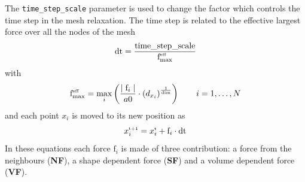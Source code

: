 \documentclass[10pt,a4paper]{book}
\newcommand{\py}[1]{\texttt{\color{blue}#1}}
\begin{document}
The \py{time\_step\_scale} parameter is used to change the factor
which controls the time step in the mesh relaxation. The time step 
is related to the effective largest force over all the nodes of the
mesh  
\begin{equation}
  \textrm{dt} = \frac{
    \textrm{time\_step\_scale}}{\textrm{f}^\textrm{\tiny eff}_{\max}}  
  \end{equation}
  with
  \begin{equation} 
  \textrm{f}^\textrm{\tiny eff}_{\max} = \max_i \left(  
    \frac{\mid \textrm{f}_{\tiny i} \mid}
    {a0} \cdot \left( d_{x_i}
    \right)^{\frac{1}{\textrm{\tiny dim}}}  \right) \qquad i = 1,
  \ldots, N
  \label{eff-force-max}
  \nonumber
\end{equation}
and each point $x_i$ is moved to its new position as 
\begin{equation}
  x_i^{\textrm{\tiny t+1} } = x_i^{\textrm{\tiny t}} + 
  \textrm{f}_i \cdot \textrm{dt} 
  \nonumber
\end{equation}
In these equations each force $\textrm{f}_i$ is made of three
contribution: a force from the neighbours (\textbf{NF}), a shape
dependent force (\textbf{SF}) and a volume dependent force (\textbf{VF}).  
\end{document}
